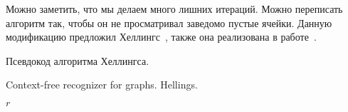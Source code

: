 Можно заметить, что мы делаем много лишних итераций.
Можно переписать алгоритм так, чтобы он не просматривал заведомо пустые ячейки.
Данную модификацию предложил Хеллингс~\cite{hellingsRelational}, также она реализована в работе~\cite{10.1007/978-3-319-46523-4_38}.

Псевдокод алгоритма Хеллингса.

\begin{algorithm}[H]
    \begin{algorithmic}[1]
        \caption{Context-free recognizer for graphs. Hellings.}
        \label{alg:graphParseHellings}

            \EndFor
        \EndFor
            \EndFor
        \EndFor

        \EndWhile
        \State \Return $r$
        \EndFunction
    \end{algorithmic}
\end{algorithm}


